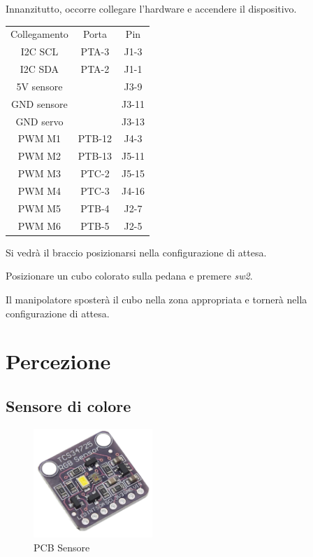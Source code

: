 \documentclass[12pt]{report}
\begin{document}
Innanzitutto, occorre collegare l'hardware e accendere il dispositivo.

\begin{table}[h]
\centering
\begin{tabular}{|c|c|c|}
    Collegamento & Porta & Pin \\
    I2C SCL & PTA-3 & J1-3 \\
    I2C SDA & PTA-2 & J1-1 \\
    5V sensore &  & J3-9 \\
    GND sensore &  & J3-11 \\
    GND servo &  & J3-13 \\
    PWM M1 & PTB-12 & J4-3 \\
    PWM M2 & PTB-13 & J5-11 \\
    PWM M3 & PTC-2 & J5-15 \\
    PWM M4 & PTC-3 & J4-16 \\
    PWM M5 & PTB-4 & J2-7 \\
    PWM M6 & PTB-5 & J2-5 \\

\end{tabular}
\end{table}

Si vedrà il braccio posizionarsi nella configurazione di attesa.

Posizionare un cubo colorato sulla pedana e premere \emph{sw2}.

Il manipolatore sposterà il cubo nella zona appropriata e tornerà nella configurazione di attesa.

\chapter{Percezione}
\section {Sensore di colore}

\begin{figure}
\centering
    \includegraphics[width=0.4\textwidth]{Immagini_sensore/pcb_sensore.png}
    \caption{PCB Sensore}
\end{figure}
\end{document}
